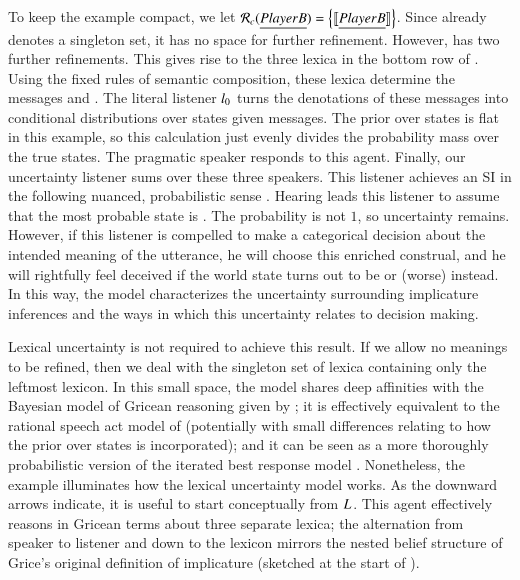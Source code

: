 \documentclass[leqno,12pt]{article}
\begin{document}
To keep the example compact, we let
$\mathcal{R}_{c}(\emph{Player B}) = \left\{ \llbracket\emph{Player B}\rrbracket \right\}$. Since
 already denotes a singleton set, it has no space for
further refinement. However,  has two further
refinements. This gives rise to the three lexica in the bottom row of
.  Using the fixed rules of semantic
composition, these lexica determine the messages  and . The literal listener
$l_{0}$ turns the denotations of these messages into
conditional distributions over states given messages. The prior over
states is flat in this example, so this calculation just evenly
divides the probability mass over the true states. The pragmatic
speaker responds to this agent. Finally, our uncertainty listener sums
over these three speakers. This listener achieves an SI in the
following nuanced, probabilistic sense
. Hearing  leads this
listener to assume that the most probable state is . The
probability is not $1$, so uncertainty remains. However, if this
listener is compelled to make a categorical decision about the
intended meaning of the utterance, he will choose this enriched
construal, and he will rightfully feel deceived if the world state
turns out to be  or (worse)  instead. In this way,
the model characterizes the uncertainty surrounding implicature
inferences \citep{Hirschberg85} and the ways in which this uncertainty
relates to decision making.

Lexical uncertainty is not required to achieve this result. If we
allow no meanings to be refined, then we deal with the singleton set
of lexica containing only the leftmost lexicon. In this small space,
the model shares deep affinities with the Bayesian model of Gricean
reasoning given by \citet{Russell:2012}; it is effectively equivalent
to the rational speech act model of \citet{Frank:Goodman:2012}
(potentially with small differences relating to how the prior over
states is incorporated); and it can be seen as a more thoroughly
probabilistic version of the iterated best response model
\citep{Franke09DISS,Jaeger:2007,Jaeger:2011}. Nonetheless, the example
illuminates how the lexical uncertainty model works. As the downward
arrows indicate, it is useful to start conceptually from
$L_{}$. This agent effectively reasons in Gricean
terms about three separate lexica; the alternation from speaker to
listener and down to the lexicon mirrors the nested belief structure
of Grice's original definition of implicature (sketched at the start
of ).
\end{document}

